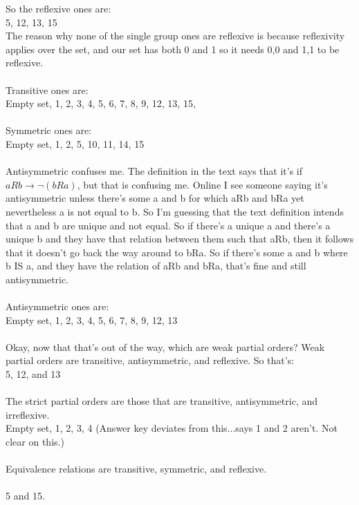 \documentclass{article}
\begin{document}
So the reflexive ones are: \\
5, 12, 13, 15
\\ The reason why none of the single group ones are reflexive is because reflexivity applies over the set, and our set has both 0 and 1 so it needs 0,0 and 1,1 to be reflexive. 
\\\\
Transitive ones are:\\
Empty set, 1, 2, 3, 4, 5, 6, 7, 8, 9, 12, 13, 15, 
\\\\
Symmetric ones are:\\
Empty set, 1, 2, 5, 10, 11, 14, 15
\\\\
Antisymmetric confuses me. The definition in the text says that it's if $aRb \rightarrow \neg (bRa)$, but that is confusing me. Online I see someone saying it's antisymmetric unless there's some a and b for which aRb and bRa yet nevertheless a is not equal to b. So I'm guessing that the text definition intends that a and b are unique and not equal. So if there's a unique a and there's a unique b and they have that relation between them such that aRb, then it follows that it doesn't go back the way around to bRa. So if there's some a and b where b IS a, and they have the relation of aRb and bRa, that's fine and still antisymmetric. 
\\
\\
Antisymmetric ones are: \\
Empty set, 1, 2, 3, 4, 5, 6, 7, 8, 9, 12, 13
\\\\
Okay, now that that's out of the way, which are weak partial orders? Weak partial orders are transitive, antisymmetric, and reflexive. So that's: \\
5, 12, and 13
\\\\
The strict partial orders are those that are transitive, antisymmetric, and irreflexive. \\
Empty set, 1, 2, 3, 4 (Answer key deviates from this...says 1 and 2 aren't. Not clear on this.)
\\\\
Equivalence relations are transitive, symmetric, and reflexive. \\\\
5 and 15.
\end{document}
